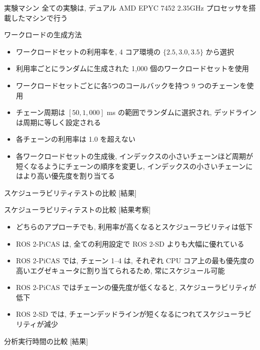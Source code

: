 \begin{frame}{実験マシン}
    全ての実験は, デュアル AMD EPYC 7452 $2.35 \mathrm{GHz}$ プロセッサを搭載したマシンで行う
\end{frame}

\begin{frame}{ワークロードの生成方法}
    \begin{itemize}
        \item ワークロードセットの利用率を, 4 コア環境の $\{2.5,3.0,3.5\}$ から選択
        \item 利用率ごとにランダムに生成された 1,000 個のワークロードセットを使用
        \item ワークロードセットごとに各5つのコールバックを持つ 9 つのチェーンを使用
        \item チェーン周期は $[50,1{,}000]$ ms の範囲でランダムに選択され, デッドラインは周期に等しく設定される
        \item 各チェーンの利用率は 1.0 を超えない
        \item 各ワークロードセットの生成後, インデックスの小さいチェーンほど周期が短くなるようにチェーンの順序を変更し, インデックスの小さいチェーンにはより高い優先度を割り当てる
    \end{itemize}
\end{frame}

\begin{frame}{スケジューラビリティテストの比較 [結果]}
\end{frame}

\begin{frame}{スケジューラビリティテストの比較 [結果考察]}
    \begin{itemize}
        \item どちらのアプローチでも, 利用率が高くなるとスケジューラビリティは低下
        \item ROS 2-PiCAS は, 全ての利用設定で ROS 2-SD よりも大幅に優れている
        \item ROS 2-PiCAS では, チェーン 1--4 は, それぞれ CPU コア上の最も優先度の高いエグゼキュータに割り当てられるため, 常にスケジュール可能
        \item ROS 2-PiCAS ではチェーンの優先度が低くなると, スケジューラビリティが低下
        \item ROS 2-SD では, チェーンデッドラインが短くなるにつれてスケジューラビリティが減少
    \end{itemize}
\end{frame}

\begin{frame}{分析実行時間の比較 [結果]}
\end{frame}

